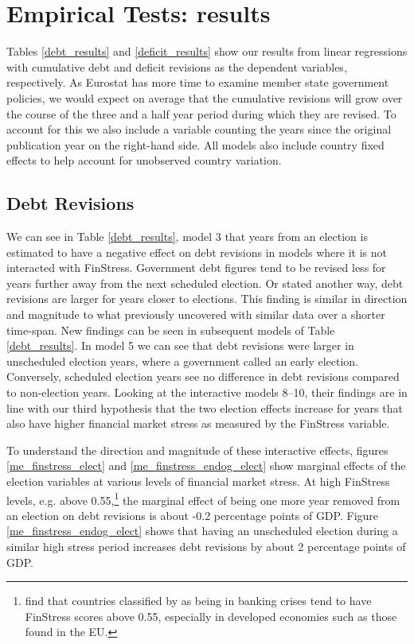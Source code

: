 \documentclass[]{article}
\begin{document}
\section{Empirical Tests: results}

Tables \ref{debt_results} and \ref{deficit_results} show our results from linear regressions with cumulative debt and deficit revisions as the dependent variables, respectively. As Eurostat has more time to examine member state government policies, we would expect on average that the cumulative revisions will grow over the course of the three and a half year period during which they are revised. To account for this we also include a variable counting the years since the original publication year on the right-hand side. All models also include country fixed effects to help account for unobserved country variation.

\subsection{Debt Revisions}

We can see in Table \ref{debt_results}, model 3 that years from an election is estimated to have a negative effect on debt revisions in models where it is not interacted with FinStress. Government debt figures tend to be revised less for years further away from the next scheduled election. Or stated another way, debt revisions are larger for years closer to elections. This finding is similar in direction and magnitude to what \cite{DeCastro2013} previously uncovered with similar data over a shorter time-span. New findings can be seen in subsequent models of Table \ref{debt_results}. In model 5 we can see that debt revisions were larger in unscheduled election years, where a government called an early election. Conversely, scheduled election years see no difference in debt revisions compared to non-election years. Looking at the interactive models 8--10, their findings are in line with our third hypothesis that the two election effects increase for years that also have higher financial market stress as measured by the FinStress variable.

To understand the direction and magnitude of these interactive effects, figures \ref{me_finstress_elect} and \ref{me_finstress_endog_elect} show marginal effects of the election variables at various levels of financial market stress. At high FinStress levels, e.g. above 0.55,\footnote{\cite{finstress_paper} find that countries classified by \cite{Laeven2012} as being in banking crises tend to have FinStress scores above 0.55, especially in developed economies such as those found in the EU.} the marginal effect of being one more year removed from an election on debt revisions is about -0.2 percentage points of GDP. Figure \ref{me_finstress_endog_elect} shows that having an unscheduled election during a similar high stress period increases debt revisions by about 2 percentage points of GDP.
\end{document}
